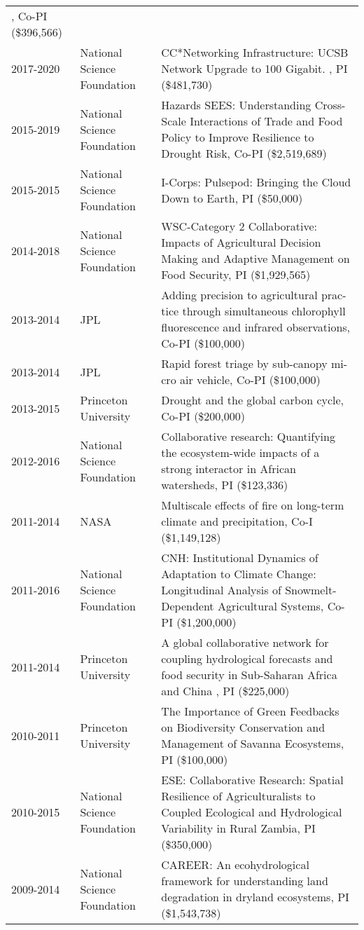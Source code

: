 \begin{longtable}{p{1.75cm}>{\raggedright}p{}p{6cm}}
, Co-PI (\$396,566) \\ 
2017-2020 & National Science Foundation & CC*Networking Infrastructure: UCSB Network Upgrade to 100 Gigabit. , PI (\$481,730) \\ 
2015-2019 & National Science Foundation & Hazards SEES: Understanding Cross-Scale Interactions of Trade and Food Policy to Improve Resilience to Drought Risk, Co-PI (\$2,519,689) \\ 
2015-2015 & National Science Foundation & I-Corps: Pulsepod: Bringing the Cloud Down to Earth, PI (\$50,000) \\ 
2014-2018 & National Science Foundation & WSC-Category 2 Collaborative: Impacts of Agricultural Decision Making and Adaptive Management on Food Security, PI (\$1,929,565) \\ 
2013-2014 & JPL & Adding precision to agricultural prac- tice through simultaneous chlorophyll fluorescence and infrared observations, Co-PI (\$100,000) \\ 
2013-2014 & JPL & Rapid forest triage by sub-canopy mi- cro air vehicle, Co-PI (\$100,000) \\ 
2013-2015 & Princeton University & Drought and the global carbon cycle, Co-PI (\$200,000) \\ 
2012-2016 & National Science Foundation & Collaborative research: Quantifying the ecosystem-wide impacts of a strong interactor in African watersheds, PI (\$123,336) \\ 
2011-2014 & NASA & Multiscale effects of fire on long-term climate and precipitation, Co-I (\$1,149,128) \\ 
2011-2016 & National Science Foundation & CNH: Institutional Dynamics of Adaptation to Climate Change: Longitudinal Analysis of Snowmelt-Dependent Agricultural Systems, Co-PI (\$1,200,000) \\ 
2011-2014 & Princeton University & A global collaborative network for coupling hydrological forecasts and food security in Sub-Saharan Africa and China , PI (\$225,000) \\ 
2010-2011 & Princeton University & The Importance of Green Feedbacks on Biodiversity Conservation and Management of Savanna Ecosystems, PI (\$100,000) \\ 
2010-2015 & National Science Foundation & ESE: Collaborative Research: Spatial Resilience of Agriculturalists to Coupled Ecological and Hydrological Variability in Rural Zambia, PI (\$350,000) \\ 
2009-2014 & National Science Foundation & CAREER: An ecohydrological framework for understanding land degradation in dryland ecosystems, PI (\$1,543,738) \\ 

\end{longtable}
